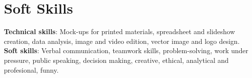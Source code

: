 \documentclass[letterpaper,11pt]{article}
\begin{document}
\section{Soft Skills}
 \begin{itemize}[leftmargin=0.15in, label={}]
    \small{\item{
     \textbf{Technical skills}{: Mock-ups for printed materials, spreadsheet and slideshow creation, data analysis, image and video edition, vector image and logo design.} \\
     \textbf{Soft skills}{: Verbal communication, teamwork skills, problem-solving, work under pressure, public speaking, decision making, creative, ethical, analytical and profesional, funny.} \\
   }}
 \end{itemize}

\end{document}
